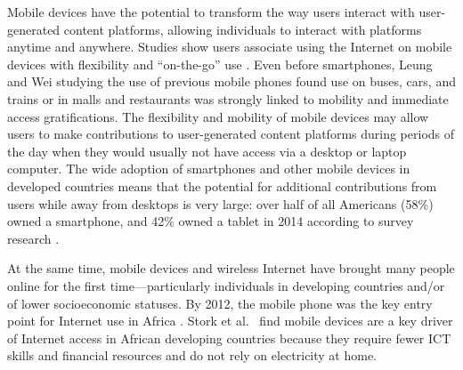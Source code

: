 \documentclass{sigchi}
\begin{document}

Mobile devices have the potential to transform the way users interact with user-generated content platforms, allowing individuals to interact with platforms anytime and anywhere. Studies show users associate using the Internet on mobile devices with flexibility and ``on-the-go'' use \cite{humphreys2013}. Even before smartphones, Leung and Wei \citeyear{leung2000} studying the use of previous mobile phones found use on buses, cars, and trains or in malls and restaurants was strongly linked to mobility and immediate access gratifications. The flexibility and mobility of mobile devices may allow users to make contributions to user-generated content platforms during periods of the day when they would usually not have access via a desktop or laptop computer.
The wide adoption of smartphones and other mobile devices in developed countries means that the potential for additional contributions from users while away from desktops is very large: over half of all Americans (58\%) owned a smartphone, and 42\% owned a tablet in 2014 according to survey research \cite{pew2014}.




At the same time, mobile devices and wireless Internet have brought many people online for the first time---particularly individuals in developing countries and/or of lower socioeconomic statuses. By 2012, the mobile phone was the key entry point for Internet use in Africa \cite{stork2012}. Stork et al.~\cite{stork2012} find mobile devices are a key driver of Internet access in African developing countries because they require fewer ICT skills and financial resources and do not rely on electricity at home.
\end{document}
